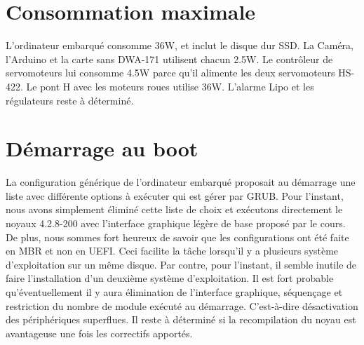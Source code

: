 \section{Consommation maximale}
L’ordinateur embarqué consomme 36W, et inclut le disque dur SSD. La Caméra, l’Arduino et la carte sans DWA-171 utilisent chacun 2.5W. Le contrôleur de servomoteurs lui consomme 4.5W parce qu’il alimente les deux servomoteurs HS-422. Le pont H avec les moteurs roues utilise 36W. L’alarme Lipo et les régulateurs reste à déterminé. 

\section{Démarrage au boot}
La configuration générique de l’ordinateur embarqué proposait au démarrage une liste avec différente options à exécuter qui est gérer par GRUB. Pour l’instant, nous avons simplement éliminé cette liste de choix et exécutons directement le noyaux 4.2.8-200 avec l’interface graphique légère de base proposé par le cours. De plus, nous sommes fort heureux de savoir que les configurations ont été faite en MBR et non en UEFI. Ceci facilite la tâche lorsqu’il y a plusieurs système d’exploitation sur un même disque. Par contre, pour l’instant, il semble inutile de faire l’installation d’un deuxième système d’exploitation. Il est fort probable qu’éventuellement il y aura élimination de l’interface graphique, séquençage et restriction du nombre de module exécuté au démarrage. C’est-à-dire désactivation des périphériques superflues. Il reste à déterminé si la recompilation du noyau est avantageuse une fois les correctifs apportés.  
